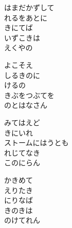 \documentclass[10pt,b5j]{tarticle} %
\begin{document}
\begin{enumerate}
\begin{minipage}[c]{\blocksize}
        \vspace{\linespace}
        \item
        はまだかずして\\
        れるをあとに\\
        きにてば\\
        いずこきは\\
        えくやの
        
        \vspace{\linespace}
        \item
        よこそえ\\
        しるきのに\\
        けるの\\
        きぶをつぶてを\\
        のとはなさん
        
        \vspace{\linespace}
        \item
        みてはえど\\
        きにいれ\\
        ストームにはうとも\\
        れじてなき\\
        このにらん
        
        \vspace{\linespace}
        \item
        かきめて\\
        えりたき\\
        にりなば\\
        きのきは\\
        のけてれん
    
    \end{minipage}
\end{enumerate} %
\end{document}
